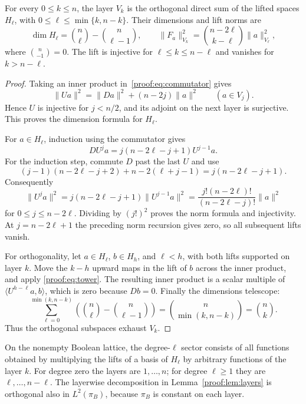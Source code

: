 \begin{lemma}\label{proof:lem:layers}
For every $0\leq k\leq n$, the layer $V_k$ is the orthogonal direct
sum of the lifted spaces $H_\ell$, with
$0\leq\ell\leq\min\{k,n-k\}$. Their dimensions and lift norms are
\begin{equation}\label{proof:eq:dimensionnorm}
 \dim H_\ell=\binom n\ell-\binom n{\ell-1},
 \qquad
 \|F_a\|_{V_k}^2=\binom{n-2\ell}{k-\ell}\|a\|_{V_\ell}^2,
\end{equation}
where $\binom n{-1}=0$. The lift is injective for
$\ell\leq k\leq n-\ell$ and vanishes for $k>n-\ell$.
\end{lemma}

\begin{proof}
Taking an inner product in~\eqref{proof:eq:commutator} gives
\[
 \|Ua\|^2=\|Da\|^2+(n-2j)\|a\|^2\qquad(a\in V_j).
\]
Hence $U$ is injective for $j<n/2$, and its adjoint on the next layer
is surjective. This proves the dimension formula for $H_\ell$.

For $a\in H_\ell$, induction using the commutator gives
\begin{equation}\label{proof:eq:tower}
 DU^ja=j(n-2\ell-j+1)U^{j-1}a.
\end{equation}
For the induction step, commute $D$ past the last $U$ and use
\[
 (j-1)(n-2\ell-j+2)+n-2(\ell+j-1)
 =j(n-2\ell-j+1).
\]
Consequently
\[
 \|U^ja\|^2
 =j(n-2\ell-j+1)\|U^{j-1}a\|^2
 =\frac{j!(n-2\ell)!}{(n-2\ell-j)!}\|a\|^2
\]
for $0\leq j\leq n-2\ell$. Dividing by $(j!)^2$ proves the norm
formula and injectivity. At $j=n-2\ell+1$ the preceding norm
recursion gives zero, so all subsequent lifts vanish.

For orthogonality, let $a\in H_\ell$, $b\in H_h$, and $\ell<h$,
with both lifts supported on layer $k$. Move the $k-h$ upward maps
in the lift of $b$ across the inner product, and apply
\eqref{proof:eq:tower}. The resulting inner product is a scalar
multiple of $\langle U^{h-\ell}a,b\rangle$, which is zero because
$Db=0$. Finally the dimensions telescope:
\[
 \sum_{\ell=0}^{\min(k,n-k)}
 \left(\binom n\ell-\binom n{\ell-1}\right)
 =\binom n{\min(k,n-k)}=\binom nk.
\]
Thus the orthogonal subspaces exhaust $V_k$.
\end{proof}

On the nonempty Boolean lattice, the degree-$\ell$ sector consists
of all functions obtained by multiplying the lifts of a basis of
$H_\ell$ by arbitrary functions of the layer $k$. For degree zero
the layers are $1,\ldots,n$; for degree $\ell\geq1$ they are
$\ell,\ldots,n-\ell$. The layerwise decomposition in
Lemma~\ref{proof:lem:layers} is orthogonal also in $L^2(\pi_B)$,
because $\pi_B$ is constant on each layer.

